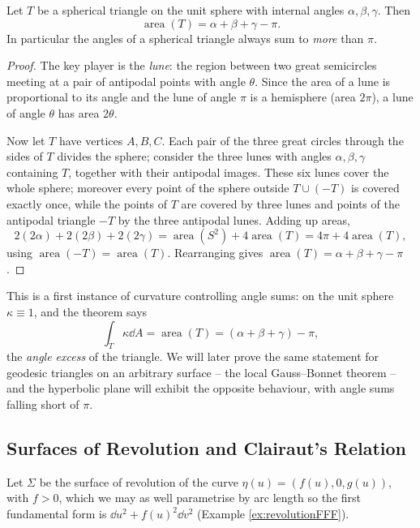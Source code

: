\begin{theorem}\label{thm:sphericalGB}
    Let $T$ be a spherical triangle on the unit sphere with internal angles $\alpha, \beta, \gamma$. Then
    $$
    \operatorname{area}(T) = \alpha + \beta + \gamma - \pi.
    $$
    In particular the angles of a spherical triangle always sum to \emph{more} than $\pi$.
\end{theorem}
\begin{proof}
    The key player is the \emph{lune}: the region between two great semicircles meeting at a pair of antipodal points with angle $\theta$. Since the area of a lune is proportional to its angle and the lune of angle $\pi$ is a hemisphere (area $2\pi$), a lune of angle $\theta$ has area $2\theta$.

    Now let $T$ have vertices $A, B, C$. Each pair of the three great circles through the sides of $T$ divides the sphere; consider the three lunes with angles $\alpha, \beta, \gamma$ containing $T$, together with their antipodal images. These six lunes cover the whole sphere; moreover every point of the sphere outside $T \cup (-T)$ is covered exactly once, while the points of $T$ are covered by three lunes and points of the antipodal triangle $-T$ by the three antipodal lunes. Adding up areas,
    $$
    2(2\alpha) + 2(2\beta) + 2(2\gamma) = \operatorname{area}(S^2) + 4\operatorname{area}(T) = 4\pi + 4\operatorname{area}(T),
    $$
    using $\operatorname{area}(-T) = \operatorname{area}(T)$. Rearranging gives $\operatorname{area}(T) = \alpha + \beta + \gamma - \pi$.
\end{proof}

This is a first instance of curvature controlling angle sums: on the unit sphere $\kappa \equiv 1$, and the theorem says
$$
\int_T \kappa \dd A = \operatorname{area}(T) = (\alpha + \beta + \gamma) - \pi,
$$
the \emph{angle excess} of the triangle. We will later prove the same statement for geodesic triangles on an arbitrary surface -- the local Gauss--Bonnet theorem -- and the hyperbolic plane will exhibit the opposite behaviour, with angle sums falling short of $\pi$.

\subsection{Surfaces of Revolution and Clairaut's Relation}

Let $\Sigma$ be the surface of revolution of the curve $\eta(u) = (f(u), 0, g(u))$, with $f > 0$, which we may as well parametrise by arc length so the first fundamental form is $\dd u^2 + f(u)^2 \dd v^2$ (Example \ref{ex:revolutionFFF}).

